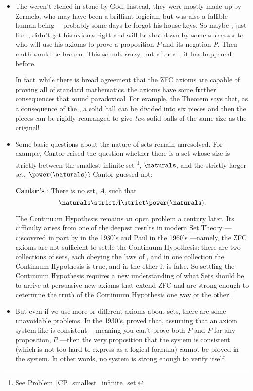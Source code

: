 %
\begin{itemize}

\item The  weren't etched in stone by God.  Instead, they
  were mostly made up by Zermelo, who may have been a brilliant logician,
  but was also a fallible human being ---probably some days he forgot his
  house keys.  So maybe , just like , didn't get
  his axioms right and will be shot down by some successor to
   who will use his axioms to prove a proposition $P$ and its
  negation $\bar{P}$.  Then math would be broken.  This sounds crazy, but
  after all, it has happened before.

  In fact, while there is broad agreement that the ZFC axioms are capable
  of proving all of standard mathematics, the axioms have some further
  consequences that sound paradoxical.  For example, the
   Theorem says that, as a consequence of the
  , a solid ball can be divided into six pieces and
  then the pieces can be rigidly rearranged to give \emph{two} solid balls
  of the same size as the original!

\item Some basic questions about the nature of sets remain unresolved.
  For example, Cantor raised the question whether there is a set whose
  size is strictly between the smallest infinite set \footnote{See
    Problem~\ref{CP_smallest_infinite_set}}, $\naturals$, and the
  strictly larger set, $\power(\naturals)$?  Cantor guessed not:

  \textbf{Cantor's }: There is no set, $A$,
  such that
  \[
  \naturals \strict A \strict \power(\naturals).
  \]

  The Continuum Hypothesis remains an open problem a century later.
  Its difficulty arises from one of the deepest results in modern Set
  Theory ---discovered in part by  in the 1930's and Paul
   in the 1960's ---namely, the ZFC axioms are not
  sufficient to settle the Continuum Hypothesis: there are two
  collections of sets, each obeying the laws of , and in one
  collection the Continuum Hypothesis is true, and in the other it is
  false.  So settling the Continuum Hypothesis requires a new
  understanding of what Sets should be to arrive at persuasive new
  axioms that extend ZFC and are strong enough to determine the truth
  of the Continuum Hypothesis one way or the other.

\item But even if we use more or different axioms about sets, there
  are some unavoidable problems.  In the 1930's,  proved
  that, assuming that an axiom system like  is
  consistent ---meaning you can't prove both $P$ and $\bar{P}$ for any
  proposition, $P$ ---then the very proposition that the system is
  consistent (which is not too hard to express as a logical formula)
  cannot be proved in the system.  In other words, no 
  system is strong enough to verify itself.
  
\end{itemize}

